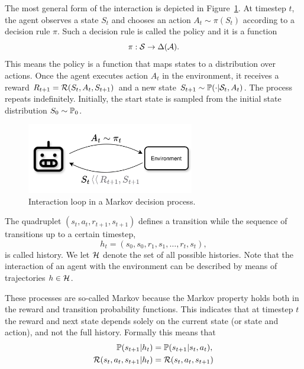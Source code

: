 The most general form of the interaction is depicted in Figure~\ref{fig:rl_loop}. At timestep $t$, the agent observes a state $S_t$ and chooses an action $A_t\sim\pi(S_t)$ according to a decision rule $\pi$. Such a decision rule is called the policy and it is a function 
\begin{equation}
\pi:\mathcal{S}\rightarrow\Delta(\mathcal{A}).
\label{eq:def_policy}
\end{equation}
This means the policy is a function that maps states to a distribution over actions. Once the agent executes action $A_t$ in the environment, it receives a reward $\linebreak R_{t+1} = \cR(S_t, A_t, S_{t+1})$ and a new state $S_{t+1}\sim\mathbb{P}(\cdot\lvert\mathcal{S}_t, A_t)$. The process repeats indefinitely. Initially, the start state is sampled from the initial state distribution $S_0\sim\mathbb{P}_0$.

\begin{figure}
  \centering
  \includegraphics[width=0.65\textwidth]{figures/RL_loop.png}
  \caption{Interaction loop in a Markov decision process.}
  \label{fig:rl_loop}
\end{figure}


The quadruplet $(s_t, a_t, r_{t+1}, s_{t+1})$ defines a transition while the sequence of transitions up to a certain timestep, \[
  h_t = (s_0, s_0, r_1, s_1,\dots,r_t,s_t),
\] is called history. We let $\mathcal{H}$ denote the set of all possible histories. Note that the interaction of an agent with the environment can be described by means of trajectories $h\in\mathcal{H}$.

These processes are so-called Markov because the Markov property holds both in the reward and transition probability functions. This indicates that at timestep $t$ the reward and next state depends solely on the current state (or state and action), and not the full history. Formally this means that
\begin{align*}
  \mathbb{P}(s_{t+1}\lvert h_t) &= \mathbb{P}(s_{t+1}\lvert s_t, a_t), \\
  \mathcal{R}(s_t, a_t, s_{t+1}\lvert h_t) &=  \mathcal{R}(s_t, a_t, s_{t+1}) 
\end{align*}

